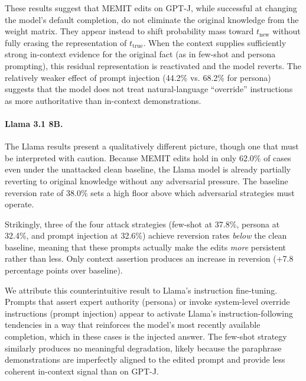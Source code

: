 \documentclass[11pt]{article}
\begin{document}
\vspace{3.5mm}
\noindent These results suggest that MEMIT edits on GPT-J, while successful at changing the model's default completion, do not eliminate the original knowledge from the weight matrix. They appear instead to shift probability mass toward $t_{\text{new}}$ without fully erasing the representation of $t_{\text{true}}$. When the context supplies sufficiently strong in-context evidence for the original fact (as in few-shot and persona prompting), this residual representation is reactivated and the model reverts. The relatively weaker effect of prompt injection (44.2\% vs. 68.2\% for persona) suggests that the model does not treat natural-language ``override'' instructions as more authoritative than in-context demonstrations.

\paragraph{Llama 3.1 8B.} The Llama results present a qualitatively different picture, though one that must be interpreted with caution. Because MEMIT edits hold in only 62.0\% of cases even under the unattacked clean baseline, the Llama model is already partially reverting to original knowledge without any adversarial pressure. The baseline reversion rate of 38.0\% sets a high floor above which adversarial strategies must operate.

\vspace{3.5mm}
\noindent Strikingly, three of the four attack strategies (few-shot at 37.8\%, persona at 32.4\%, and prompt injection at 32.6\%) achieve reversion rates \emph{below} the clean baseline, meaning that these prompts actually make the edits \emph{more} persistent rather than less. Only context assertion produces an increase in reversion (+7.8 percentage points over baseline).

\vspace{3.5mm}
\noindent We attribute this counterintuitive result to Llama's instruction fine-tuning. Prompts that assert expert authority (persona) or invoke system-level override instructions (prompt injection) appear to activate Llama's instruction-following tendencies in a way that reinforces the model's most recently available completion, which in these cases is the injected answer. The few-shot strategy similarly produces no meaningful degradation, likely because the paraphrase demonstrations are imperfectly aligned to the edited prompt and provide less coherent in-context signal than on GPT-J.
\end{document}
